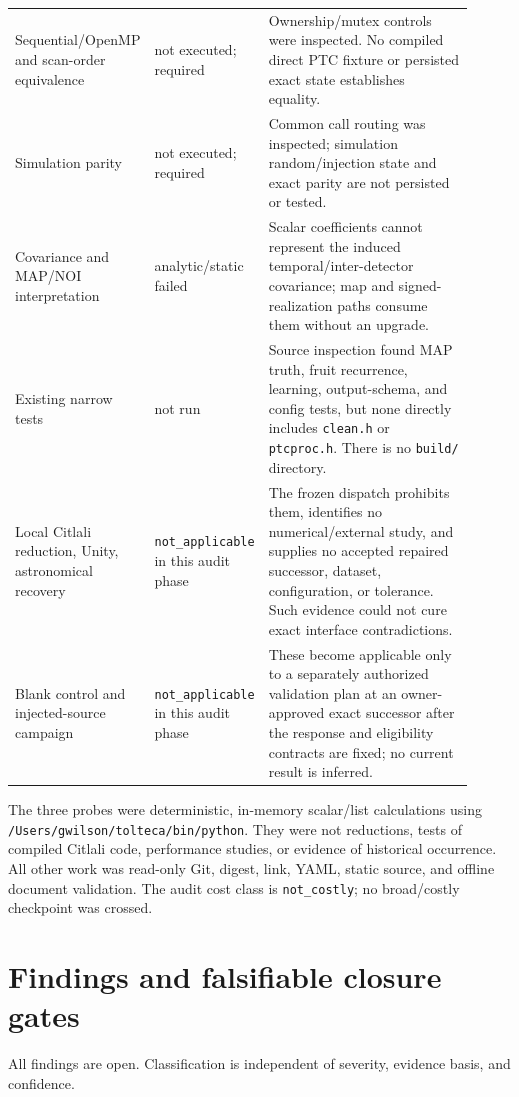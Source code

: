 \documentclass[11pt]{article}
\newcommand{\code}[1]{\nolinkurl{#1}}
\begin{document}
\begin{longtable}{L{0.27\linewidth}L{0.17\linewidth}L{0.47\linewidth}}
Sequential/OpenMP and scan-order equivalence &
not executed; required &
Ownership/mutex controls were inspected.  No compiled direct PTC fixture or
persisted exact state establishes equality.\\
Simulation parity &
not executed; required &
Common call routing was inspected; simulation random/injection state and
exact parity are not persisted or tested.\\
Covariance and MAP/NOI interpretation &
analytic/static failed &
Scalar coefficients cannot represent the induced temporal/inter-detector
covariance; map and signed-realization paths consume them without an upgrade.\\
Existing narrow tests &
not run &
Source inspection found MAP truth, fruit recurrence, learning, output-schema,
and config tests, but none directly includes \code{clean.h} or
\code{ptcproc.h}.  There is no \code{build/} directory.\\
Local Citlali reduction, Unity, astronomical recovery &
\code{not_applicable} in this audit phase &
The frozen dispatch prohibits them, identifies no numerical/external study,
and supplies no accepted repaired successor, dataset, configuration, or
tolerance.  Such evidence could not cure exact interface contradictions.\\
Blank control and injected-source campaign &
\code{not_applicable} in this audit phase &
These become applicable only to a separately authorized validation plan at an
owner-approved exact successor after the response and eligibility contracts
are fixed; no current result is inferred.\\
\bottomrule
\end{longtable}

The three probes were deterministic, in-memory scalar/list calculations using
\code{/Users/gwilson/tolteca/bin/python}.  They were not reductions, tests of
compiled Citlali code, performance studies, or evidence of historical
occurrence.  All other work was read-only Git, digest, link, YAML, static
source, and offline document validation.  The audit cost class is
\texttt{not\_costly}; no broad/costly checkpoint was crossed.

\section{Findings and falsifiable closure gates}

All findings are open.  Classification is independent of severity, evidence
basis, and confidence.
\end{document}
